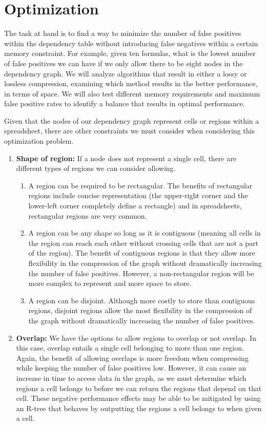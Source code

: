 \documentclass[11pt]{article}
\begin{document}
\section{Optimization}

The task at hand is to find a way to minimize the number of false positives within the dependency table without introducing false negatives within a certain memory constraint. For example, given ten formulas, what is the lowest number of false positives we can have if we only allow there to be eight nodes in the dependency graph. We will analyze algorithms that result in either a lossy or lossless compression, examining which method results in the better performance, in terms of space. We will also test different memory requirements and maximum false positive rates to identify a balance that results in optimal performance.

Given that the nodes of our dependency graph represent cells or regions within a spreadsheet, there are other constraints we must consider when considering this optimization problem.

\begin{enumerate}
    \item \textbf{Shape of region:} If a node does not represent a single cell, there are different types of regions we can consider allowing.
    \begin{enumerate}
        \item A region can be required to be rectangular. The benefits of rectangular regions include concise representation (the upper-right corner and the lower-left corner completely define a rectangle) and in spreadsheets, rectangular regions are very common.
        \item A region can be any shape so long as it is contiguous (meaning all cells in the region can reach each other without crossing cells that are not a part of the region). The benefit of contiguous regions is that they allow more flexibility in the compression of the graph without dramatically increasing the number of false positives. However, a non-rectangular region will be more complex to represent and more space to store.
        \item A region can be disjoint. Although more costly to store than contiguous regions, disjoint regions allow the most flexibility in the compression of the graph without dramatically increasing the number of false positives.
    \end{enumerate}
    \item \textbf{Overlap:} We have the options to allow regions to overlap or not overlap. In this case, overlap entails a single cell belonging to more than one region. Again, the benefit of allowing overlaps is more freedom when compressing while keeping the number of false positives low. However, it can cause an increase in time to access data in the graph, as we must determine which regions a cell belongs to before we can return the regions that depend on that cell. These negative performance effects may be able to be mitigated by using an R-tree that behaves by outputting the regions a cell belongs to when given a cell.
\end{enumerate}
\end{document}
